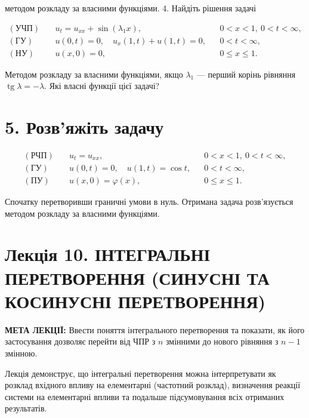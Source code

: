 методом розкладу за власними функціями. 4. Найдіть рішення задачі

\[
\begin{aligned}
(\text{УЧП})\quad & u_t = u_{xx} + \sin(\lambda_1 x), && 0 < x < 1,\ 0 < t < \infty, \\
(\text{ГУ})\quad & u(0,t) = 0,\quad u_x(1,t) + u(1,t) = 0, && 0 < t < \infty, \\
(\text{НУ})\quad & u(x,0) = 0, && 0 \leqslant x \leqslant 1.
\end{aligned}
\]

Методом розкладу за власними функціями, якщо \(\lambda_1\) --- перший корінь рівняння \(\operatorname{tg}\lambda = -\lambda\). Які власні функції цієї задачі?

\section{5. Розв'яжіть задачу}\label{ux440ux43eux437ux432ux44fux436ux456ux442ux44c-ux437ux430ux434ux430ux447ux443-1}

\[
\begin{aligned}
(\text{РЧП})\quad & u_t = u_{xx}, && 0 < x < 1,\ 0 < t < \infty, \\
(\text{ГУ})\quad & u(0,t) = 0,\quad u(1,t) = \cos t, && 0 < t < \infty, \\
(\text{ПУ})\quad & u(x,0) = \varphi(x), && 0 \leqslant x \leqslant 1.
\end{aligned}
\]

Спочатку перетворивши граничні умови в нуль. Отримана задача розв'язується методом розкладу за власними функціями.

\section{Лекція 10. ІНТЕГРАЛЬНІ ПЕРЕТВОРЕННЯ (СИНУСНІ ТА КОСИНУСНІ ПЕРЕТВОРЕННЯ)}\label{ux43bux435ux43aux446ux456ux44f-10.-ux456ux43dux442ux435ux433ux440ux430ux43bux44cux43dux456-ux43fux435ux440ux435ux442ux432ux43eux440ux435ux43dux43dux44f-ux441ux438ux43dux443ux441ux43dux456-ux442ux430-ux43aux43eux441ux438ux43dux443ux441ux43dux456-ux43fux435ux440ux435ux442ux432ux43eux440ux435ux43dux43dux44f}

\textbf{МЕТА ЛЕКЦІЇ:} Ввести поняття інтегрального перетворення та показати, як його застосування дозволяє перейти від ЧПР з \(n\) змінними до нового рівняння з \(n - 1\) змінною.

Лекція демонструє, що інтегральні перетворення можна інтерпретувати як розклад вхідного впливу на елементарні (частотний розклад), визначення реакції системи на елементарні впливи та подальше підсумовування всіх отриманих результатів.

